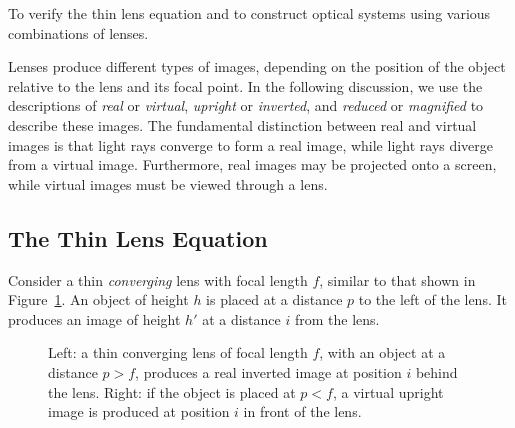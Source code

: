 \documentclass[addpoints]{physlabs}
\begin{document}
\begin{labsection}

\begin{objective}
    To verify the thin lens equation and to construct optical systems using various combinations of lenses.
\end{objective}
    
\begin{theory}
    
    Lenses produce different types of images, depending on the position of the object relative to the lens and its focal point.
    In the following discussion, we use the descriptions of \textsl{real} or \textsl{virtual}, \textsl{upright} or \textsl{inverted}, and \textsl{reduced} or \textsl{magnified} to describe these images. The fundamental distinction between real and virtual images is that light rays converge to form a real image, while light rays diverge from a virtual image. Furthermore, real images may be projected onto a screen, while virtual images must be viewed through a lens.

    \subsection*{The Thin Lens Equation}

   Consider a thin \textsl{converging} lens with focal length $f$, similar to that shown in Figure~\ref{fig: converging lens}. An object of height $h$ is placed at a distance $p$ to the left of the lens. It produces an image of height $h'$ at a distance $i$ from the lens.

    \begin{figure}[ht]
        \centering
        
        \caption{Left: a thin converging lens of focal length $f$, with an object at a distance $p>f$, produces a real inverted image at position $i$ behind the lens. Right: if the object is placed at $p<f$, a virtual upright image is produced at position $i$ in front of the lens.}
        \label{fig: converging lens}
    \end{figure}



\end{theory}
\end{labsection}
\end{document}
